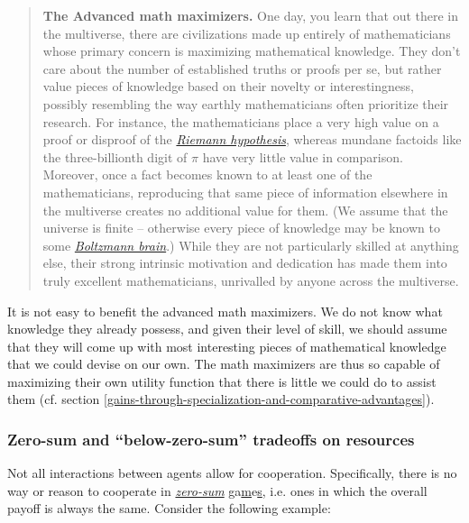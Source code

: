 \begin{quote}
\textbf{The Advanced math maximizers.} One day, you learn that out there
in the multiverse, there are civilizations made up entirely of
mathematicians whose primary concern is maximizing mathematical
knowledge. They don't care about the number of established truths or
proofs per se, but rather value pieces of knowledge based on their
novelty or interestingness, possibly resembling the way earthly
mathematicians often prioritize their research. For instance, the
mathematicians place a very high value on a proof or disproof of the
\href{https://en.wikipedia.org/wiki/Riemann_hypothesis}{\emph{Riemann
hypothesis}}, whereas mundane factoids like the three-billionth digit of
\(\pi\) have very little value in comparison. Moreover, once a fact
becomes known to at least one of the mathematicians, reproducing that
same piece of information elsewhere in the multiverse creates no
additional value for them. (We assume that the universe is finite --
otherwise every piece of knowledge may be known to some
\href{https://en.wikipedia.org/wiki/Boltzmann_brain}{\emph{Boltzmann
brain}}.) While they are not particularly skilled at anything else,
their strong intrinsic motivation and dedication has made them into
truly excellent mathematicians, unrivalled by anyone across the
multiverse.
\end{quote}

It is not easy to benefit the advanced math maximizers. We do not know
what knowledge they already possess, and given their level of skill, we
should assume that they will come up with most interesting pieces of
mathematical knowledge that we could devise on our own. The math
maximizers are thus so capable of maximizing their own utility function
that there is little we could do to assist them (cf. section
\ref{gains-through-specialization-and-comparative-advantages}).

\hypertarget{zero-sum-and-below-zero-sum-tradeoffs-on-resources}{\subsubsection{Zero-sum
and ``below-zero-sum'' tradeoffs on
resources}\label{zero-sum-and-below-zero-sum-tradeoffs-on-resources}}

Not all interactions between agents allow for cooperation. Specifically,
there is no way or reason to cooperate in
\href{https://en.wikipedia.org/wiki/Zero-sum_game}{\emph{zero-sum}}
\href{https://en.wikipedia.org/wiki/Zero-sum_game}{g}a\href{https://en.wikipedia.org/wiki/Zero-sum_game}{m}e\href{https://en.wikipedia.org/wiki/Zero-sum_game}{s},
i.e. ones in which the overall payoff is always the same. Consider the
following example:

